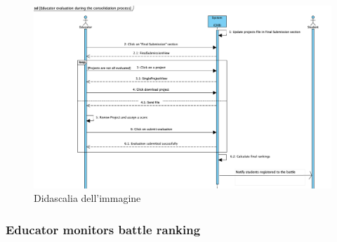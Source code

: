 \begin{figure}[H]
  \includegraphics[width=1\linewidth]{SequenceDiagram/Educator evaluation during the consolidation process.png} 
  \caption{Didascalia dell'immagine}
  \label{fig:immagine}
\end{figure}





\subsubsection{Educator monitors battle ranking}

